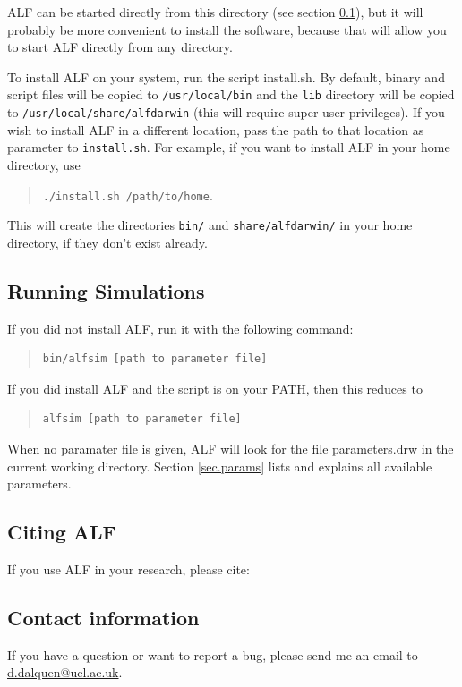 \documentclass[11pt]{article}
\begin{document}
ALF can be started directly from this directory (see section \ref{sec.run}), but it will probably be more convenient to install the software, because that will allow you to start ALF directly from any directory.

To install ALF on your system, run the script install.sh. By default, binary and script files will be copied to \texttt{/usr/local/bin} and the \texttt{lib} directory will be copied to \texttt{/usr/local/share/alfdarwin} (this will require super user privileges). If you wish to install ALF in a different location, pass the path to that location as parameter to \texttt{install.sh}. For example, if you want to install ALF in your home directory, use
\begin{quote}
\texttt{./install.sh /path/to/home}.
\end{quote}
This will create the directories \texttt{bin/} and \texttt{share/alfdarwin/} in your home directory, if they don't exist already.

\subsection{Running Simulations}
\label{sec.run}
If you did not install ALF, run it with the following command:
\begin{quote}
\begin{verbatim}
bin/alfsim [path to parameter file]
\end{verbatim}
\end{quote}
If you did install ALF and the script is on your PATH, then this reduces to
\begin{quote}
\begin{verbatim}
alfsim [path to parameter file]
\end{verbatim}
\end{quote}

When no paramater file is given, ALF will look for the file parameters.drw in
the current working directory. Section \ref{sec.params} lists and explains all available parameters.

\subsection{Citing ALF}
If you use ALF in your research, please cite:
\begin{quote}
\end{quote}

\subsection{Contact information}
If you have a question or want to report a bug, please send
me an email to \url{d.dalquen@ucl.ac.uk}. 
\end{document}
